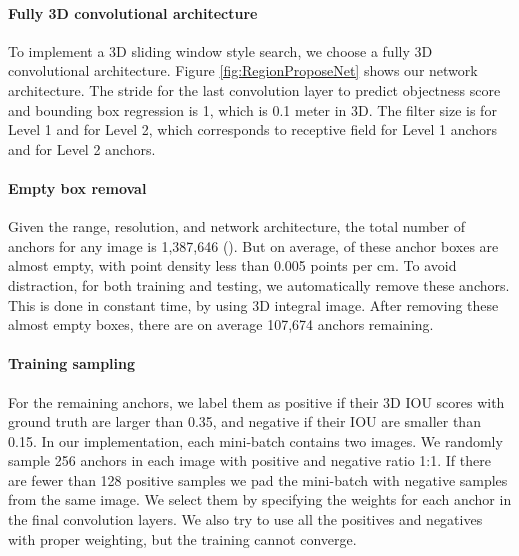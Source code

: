 \documentclass[10pt,twocolumn,letterpaper]{article}
\begin{document}
\vspace{-4mm}\paragraph{Fully 3D convolutional architecture}
To implement a 3D sliding window style search, we choose a fully 3D convolutional architecture.
Figure \ref{fig:RegionProposeNet} shows our network architecture. 
The stride for the last convolution layer to predict objectness score and bounding box regression is 1, which is 0.1 meter in 3D.
The filter size is  for Level 1 and  for Level 2,
which corresponds to  receptive field for Level 1 anchors and  for Level 2 anchors.

\vspace{-4mm}\paragraph{Empty box removal}
Given the range, resolution, and network architecture, the total number of anchors for any image is 1,387,646 ().
But on average,  of these anchor boxes are almost empty, with point density less than 0.005 points per cm.
To avoid distraction, 
for both training and testing, we automatically remove these anchors.
This is done in constant time, by using 3D integral image. 
After removing these almost empty boxes,  there are on average 107,674 anchors remaining.

\vspace{-4mm}\paragraph{Training sampling}
For the remaining anchors, we label them as positive if their 3D IOU scores with ground truth are larger than 0.35,
and negative if their IOU are smaller than 0.15. 
In our implementation, each mini-batch contains two images.
We randomly sample 256 anchors in each image with positive and negative ratio 1:1. 
If there are fewer than 128 positive samples we pad the mini-batch with negative samples from the same image.
We select them by specifying the weights for each anchor in the final convolution layers.
We also try to use all the positives and negatives with proper weighting, but the training cannot converge.
\end{document}
